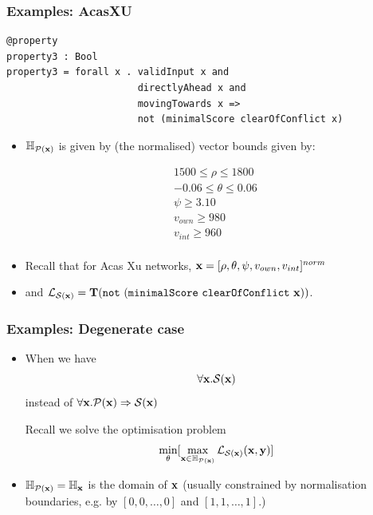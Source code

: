 \documentclass[aspectratio=169]{beamer}
\newcommand{\xs}{\x} 			%
\begin{document}
\begin{frame}[fragile]
\frametitle{Examples: AcasXU}

\begin{block}{}
\begin{verbatim}
@property
property3 : Bool
property3 = forall x . validInput x and
                       directlyAhead x and
                       movingTowards x =>
                       not (minimalScore clearOfConflict x)
\end{verbatim}
\end{block}

\begin{itemize}
\item $\mathbb{H}_{\mathcal{P}(\xs)}$ is given by (the normalised) vector bounds given by:

\begin{equation*}
\begin{array}{l}
1500 \leq \rho \leq 1800 \  \\
-0.06 \leq \theta \leq 0.06 \  \\
\psi \geq 3.10 \  \\
  v_{own} \geq 980 \ \\
v_{int} \geq 960 \  \\

\end{array}
\end{equation*}

\item Recall that for Acas Xu networks, $\mathbf{x} = [\rho, \theta, \psi, v_{own}, v_{int}]^{norm}$

\pause

\item  and $\lossfn_{\mathcal{S}(\xs)} = \translation (\mathtt{not\ (minimalScore\ clearOfConflict}\ \xs))$.


\end{itemize}
\end{frame}



\begin{frame}[fragile]
\frametitle{Examples: Degenerate case}
\begin{itemize}
\item When we have $$\forall \xs. \mathcal{S}(\xs)$$
instead of
$\forall \xs. \mathcal{P}(\xs) \Rightarrow \mathcal{S}(\xs)$
\begin{block}{Recall we solve the optimisation problem}
$$\min_{\theta} [ \max_{\xs \in \mathbb{H}_{\mathcal{P}(\xs)}} \lossfn_{\mathcal{S}(\xs)}(\xs, \y)]$$
\end{block}


\item $\mathbb{H}_{\mathcal{P}(\xs)} = \mathbb{H}_{\xs}$ is the domain of $\xs$ (usually constrained by normalisation boundaries, e.g. by $[0, 0 , \ldots , 0]$ and $[1, 1 , \ldots , 1]$.)



\end{itemize}

\end{frame}
\end{document}
